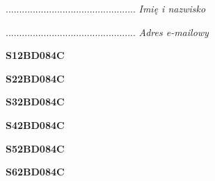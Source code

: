 \begin{turn}{90}\begin{minipage}{\linewidth} \vspace{20mm} ................................................  \textit{Imię i nazwisko}\end{minipage}\end{turn}

\begin{turn}{90}\begin{minipage}{\linewidth} \vspace{20mm} ................................................  \textit{Adres e-mailowy}\end{minipage}\end{turn}

\begin{turn}{90}\huge \begin{minipage}{\linewidth} \vspace{10mm}\textbf{S12BD084C}\end{minipage}\end{turn}

\begin{turn}{90}\huge \begin{minipage}{\linewidth} \vspace{10mm}\textbf{S22BD084C}\end{minipage}\end{turn}

\begin{turn}{90}\huge \begin{minipage}{\linewidth} \vspace{10mm}\textbf{S32BD084C}\end{minipage}\end{turn}

\begin{turn}{90}\huge \begin{minipage}{\linewidth} \vspace{10mm}\textbf{S42BD084C}\end{minipage}\end{turn}

\begin{turn}{90}\huge \begin{minipage}{\linewidth} \vspace{10mm}\textbf{S52BD084C}\end{minipage}\end{turn}

\begin{turn}{90}\huge \begin{minipage}{\linewidth} \vspace{10mm}\textbf{S62BD084C}\end{minipage}\end{turn}


